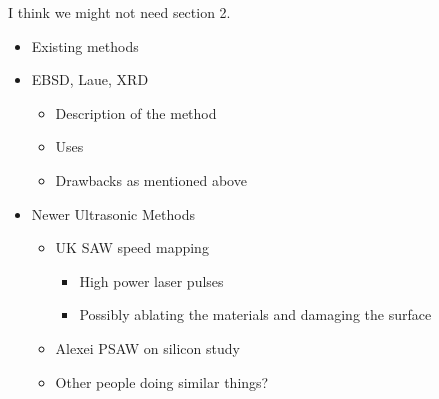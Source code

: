 
I think we might not need section 2. 

\begin{itemize}
\item Existing methods
\item EBSD, Laue, XRD
\begin{itemize}
\item Description of the method
\item Uses
\item Drawbacks as mentioned above
\end{itemize}
\item Newer Ultrasonic Methods
\begin{itemize}
\item UK SAW speed mapping
\begin{itemize}
\item High power laser pulses
\item Possibly ablating the materials and damaging the surface
\end{itemize}
\item Alexei PSAW on silicon study
\item Other people doing similar things?
\end{itemize}
\end{itemize}